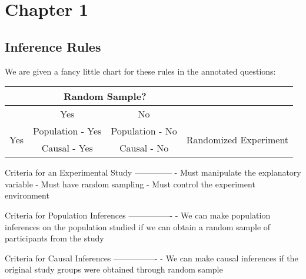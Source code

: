 \documentclass{article}
\title{\titletext}
\author{\authortext}
\theoremstyle{plain}
\theoremstyle{definition}
\theoremstyle{definition}
\begin{document}
\section{Chapter 1}
\subsection{Inference Rules}
We are given a fancy little chart for these rules in the annotated questions:\\
\begin{tabular}{|c|c|c|c|}
                        \hline&\multicolumn{2}{c|}{Random Sample?}&\\
                        \hline& Yes & No &\\
    \hline\multirow{2}{*}{Yes}&Population - Yes & Population - No & \multirow{2}{*}{Randomized Experiment}\\
    & Causal - Yes & Causal - No&\\
    
\end{tabular}
\begin{markdown}
Criteria for an Experimental Study
--------------
- Must manipulate the explanatory variable
- Must have random sampling
- Must control the experiment environment

Criteria for Population Inferences
----------------
- We can make population inferences on the population studied if we can obtain a random sample of participants from the study

Criteria for Causal Inferences
----------------
- We can make causal inferences if the original study groups were obtained through random sample

\end{markdown}
\end{document}
